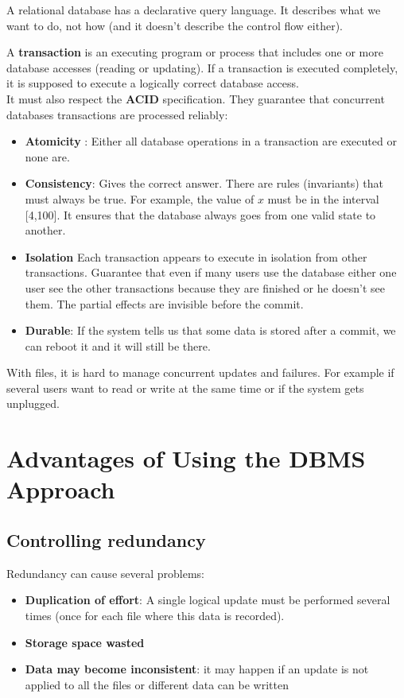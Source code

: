 A relational database has a declarative query language. It describes what we want to do, not how (and it doesn't describe the control flow either).

A \textbf{transaction} is an executing program or process that includes one or more database accesses (reading or updating). If a transaction is executed completely, it is supposed to execute a logically correct database access.\\

It must also respect the \textbf{ACID} specification. They guarantee that concurrent databases transactions are processed reliably:\\

\begin{itemize}
    \item \textbf{Atomicity} : Either all database operations in a transaction are executed or none are.
    \item \textbf{Consistency}: Gives the correct answer. There are rules (invariants) that must always be true. For example, the value of $x$ must be in the interval [4,100]. It ensures that the database always goes from one valid state to another.
    \item \textbf{Isolation} Each transaction appears to execute in isolation from other transactions. Guarantee that even if many users use the database either one user see the other transactions because they are finished or he doesn't see them. The partial effects are invisible before the commit.
    \item \textbf{Durable}: If the system tells us that some data is stored after a commit, we can reboot it and it will still be there.
\end{itemize}

With files, it is hard to manage concurrent updates and failures. For example if several users want to read or write at the same time or if the system gets unplugged.

\section{Advantages of Using the DBMS Approach}
\subsection{Controlling redundancy}

Redundancy can cause several problems:

\begin{itemize}
    \item \textbf{Duplication of effort}: A single logical update must be performed several times (once for each file where this data is recorded).
    \item \textbf{Storage space wasted}
    \item \textbf{Data may become inconsistent}: it may happen if an update is not applied to all the files or different data can be written
\end{itemize}

